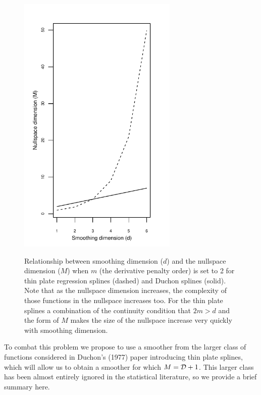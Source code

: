 \documentclass[useAMS, referee]{biom}
\begin{document}
\begin{figure}
\centering
\includegraphics[width=3in]{figs/nullspace-dim.pdf} \\
\caption{Relationship between smoothing dimension ($d$) and the nullspace dimension ($M$) when $m$ (the derivative penalty order) is set to 2 for thin plate regression splines (dashed) and Duchon splines (solid). Note that as the nullspace dimension increases, the complexity of those functions in the nullspace increases too. For the thin plate splines a combination of the continuity condition that $2m>d$ and the form of $M$ makes the size of the nullspace increase very quickly with smoothing dimension.}
\label{nullspace-dim}
\end{figure}


To combat this problem we propose to use a smoother from the larger class of functions considered in Duchon's (1977) paper introducing thin plate splines, which will allow us to obtain a smoother for which $M = {\cal D} + 1$. This larger class has been almost entirely ignored in the statistical literature, so we provide a brief summary here. 
\end{document}
